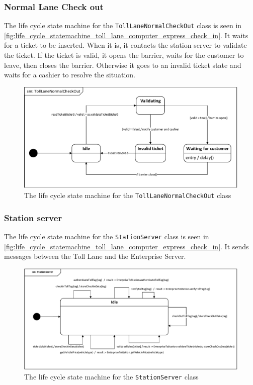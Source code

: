 \subsubsection*{Normal Lane Check out}
The life cycle state machine for the \texttt{TollLaneNormalCheckOut} class is seen in \autoref{fig:life_cycle_statemachine_toll_lane_computer_express_check_in}. It waits for a ticket to be inserted. When it is, it contacts the station server to validate the ticket. If the ticket is valid, it opens the barrier, waits for the customer to leave, then closes the barrier. Otherwise it goes to an invalid ticket state and waits for a cashier to resolve the situation.
\begin{figure}[H]
\centering
\includegraphics[width=0.7\linewidth]{img/behaviour_state_machines/life_cycle_state_machines/life_cycle_state_machine_toll_computer_normal_lane}
\caption{The life cycle state machine for the \texttt{TollLaneNormalCheckOut} class}
\label{fig:life_cycle_state_machine_toll_computer_normal_lane}
\end{figure}

\subsubsection*{Station server}
The life cycle state machine for the \texttt{StationServer} class is seen in \autoref{fig:life_cycle_statemachine_toll_lane_computer_express_check_in}. It sends messages between the Toll Lane and the Enterprise Server.
\begin{figure}[H]
\centering
\includegraphics[width=0.7\linewidth]{img/behaviour_state_machines/life_cycle_state_machines/life_cycle_state_machine_station_server}
\caption{The life cycle state machine for the \texttt{StationServer} class}
\label{fig:life_cycle_state_machine_station_server}
\end{figure}


